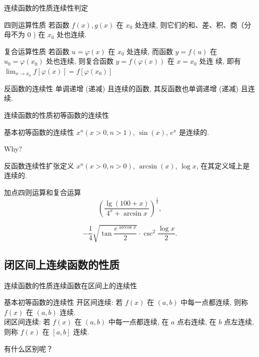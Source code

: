 \documentclass[
10pt,
aspectratio=43,
]{beamer}
\begin{document}
\begin{frame}{连续函数的性质}{连续性判定}
	\begin{exampleblock}{四则运算性质}
		若函数 $f(x), g(x)$ 在 $x_0$ 处连续, 则它们的和、差、积、商（分 母不为 0 ) 在 $x_0$ 处也连续.

	\end{exampleblock}
	\begin{exampleblock}{复合运算性质}
		若函数 $u=\varphi(x)$ 在 $x_0$ 处连续, 而函数 $y=f(u)$ 在 $u_0=\varphi\left(x_0\right)$ 处也连续, 则复合函数 $y=f(\varphi(x))$ 在 $x=x_0$ 处连 续, 即有 $\lim _{x \rightarrow x_0} f[\varphi(x)]=f\left[\varphi\left(x_0\right)\right]$
	
	\end{exampleblock}

	\begin{exampleblock}{反函数的连续性}
		单调递增 (递减) 且连续的函数, 其反函数也单调递增 (递减) 且连续.
	\end{exampleblock}
	
\end{frame}

\begin{frame}{连续函数的性质}{初等函数的连续性}
	\begin{block}{基本初等函数的连续性}
		$x^n (x>0,n>1)$, $\sin(x)$, $e^x$ 是连续的.
	\end{block}
	Why?
	\begin{exampleblock}{反函数连续性扩张定义}
		$x^n (x>0,n>0)$, $\arcsin(x)$, $\log{x}$, 在其定义域上是连续的.
	\end{exampleblock}

	\begin{exampleblock}{加点四则运算和复合运算}
		\[\left(\frac{\lg (100+x)}{4^x+\arcsin x}\right)^{\frac{1}{2}},\]

		\[-\frac{1}{4} \sqrt{\tan \frac{e^{\arccos x}}{2}} \cdot \csc ^2 \frac{\log x}{2}.\]
	\end{exampleblock}
	
\end{frame}

\subsection{闭区间上连续函数的性质}
\begin{frame}{连续函数的性质}{连续函数在区间上的连续性}
	\begin{block}{基本初等函数的连续性}
		开区间连续: 若 $f(x)$ 在 $(a, b)$ 中每一点都连续, 则称 $f(x)$ 在 $(a, b)$ 连续.\pause \\
		闭区间连续: 若 $f(x)$ 在 $(a, b)$ 中每一点都连续, 在 $a$ 点右连续, 在 $b$ 点左连续, 则称 $f(x)$ 在 $[a, b]$ 连续.
	\end{block}
	\pause 有什么区别呢？
\end{frame}
\end{document}
